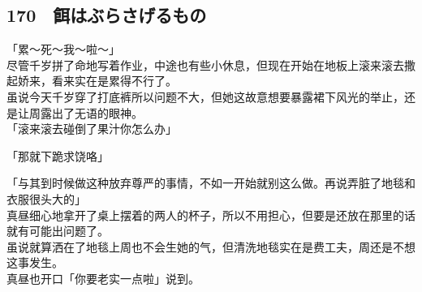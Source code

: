 \subsection{170　餌はぶらさげるもの}

「累～死～我～啦～」\\

尽管千岁拼了命地写着作业，中途也有些小休息，但现在开始在地板上滚来滚去撒起娇来，看来实在是累得不行了。\\

虽说今天千岁穿了打底裤所以问题不大，但她这故意想要暴露裙下风光的举止，还是让周露出了无语的眼神。\\

「滚来滚去碰倒了果汁你怎么办」

「那就下跪求饶咯」

「与其到时候做这种放弃尊严的事情，不如一开始就别这么做。再说弄脏了地毯和衣服很头大的」\\

真昼细心地拿开了桌上摆着的两人的杯子，所以不用担心，但要是还放在那里的话就有可能出问题了。\\

虽说就算洒在了地毯上周也不会生她的气，但清洗地毯实在是费工夫，周还是不想这事发生。\\

真昼也开口「你要老实一点啦」说到。

